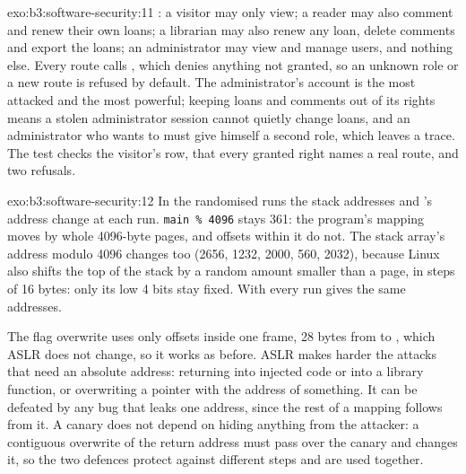 \begin{solution}{exo:b3:software-security:11}
: a visitor may only view; a reader may also comment and renew their own loans; a librarian may also renew any loan, delete comments and export the loans; an administrator may view and manage users, and nothing else. Every route calls , which denies anything not granted, so an unknown role or a new route is refused by default. The administrator's account is the most attacked and the most powerful; keeping loans and comments out of its rights means a stolen administrator session cannot quietly change loans, and an administrator who wants to must give himself a second role, which leaves a trace. The test checks the visitor's row, that every granted right names a real route, and two refusals.
\end{solution}

\begin{solution}{exo:b3:software-security:12}
In the randomised runs the stack addresses and 's address change at each run. \texttt{main \% 4096} stays 361: the program's mapping moves by whole 4096-byte pages, and offsets within it do not. The stack array's address modulo 4096 changes too (2656, 1232, 2000, 560, 2032), because Linux also shifts the top of the stack by a random amount smaller than a page, in steps of 16 bytes: only its low 4 bits stay fixed. With  every run gives the same addresses.

\label{out:b3:software-security:aslr}

 The flag overwrite uses only offsets inside one frame, 28 bytes from  to , which ASLR does not change, so it works as before. ASLR makes harder the attacks that need an absolute address: returning into injected code or into a library function, or overwriting a pointer with the address of something. It can be defeated by any bug that leaks one address, since the rest of a mapping follows from it. A canary does not depend on hiding anything from the attacker: a contiguous overwrite of the return address must pass over the canary and changes it, so the two defences protect against different steps and are used together.
\end{solution}


